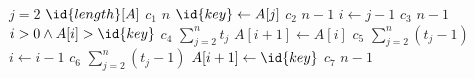   \begin{codebox}
    \li \For $j = 2$ \To $\id{length}[A]$ \> \> \> \> \> \> \> \> \> \> $c_1$ \> $n$
    \li \Do 
    \li   $\id{key} \gets A[j]$ \> \> \> \> \> \> \> \> $c_2$ \> $n-1$
    \li   $i \gets j-1$ \> \> \> \> \> \> \> \> $c_3$ \> $n-1$
    \li   \While $i > 0 \land A[i] > \id{key}$  \> \> \> \> \> \> \> \> $c_4$ \> $\sum_{j=2}^{n} t_j$
    \li   \Do
    \li     $A[i+1] \gets A[i]$ \> \> \> \> \> \> $c_5$ \> $\sum_{j=2}^{n} (t_j-1)$
    \li     $i \gets i - 1$     \> \> \> \> \> \> $c_6$ \> $\sum_{j=2}^{n} (t_j-1)$
          \End
    \li   $A[i+1] \gets \id{key}$ \> \> \> \> \> \> \> \> $c_7$ \> $n-1$
        \End
  \end{codebox}


